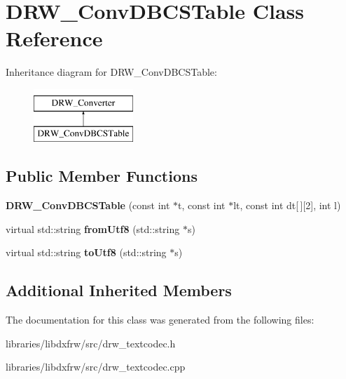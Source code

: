 \hypertarget{classDRW__ConvDBCSTable}{\section{D\-R\-W\-\_\-\-Conv\-D\-B\-C\-S\-Table Class Reference}
\label{classDRW__ConvDBCSTable}
}
Inheritance diagram for D\-R\-W\-\_\-\-Conv\-D\-B\-C\-S\-Table\-:\begin{figure}[H]
\begin{center}
\leavevmode
\includegraphics[height=2.000000cm]{classDRW__ConvDBCSTable}
\end{center}
\end{figure}
\subsection*{Public Member Functions}
\begin{DoxyCompactItemize}
\item 
\hypertarget{classDRW__ConvDBCSTable_a9708d6046edd8e7d38a1c82d7ba73ea6}{{\bfseries D\-R\-W\-\_\-\-Conv\-D\-B\-C\-S\-Table} (const int $\ast$t, const int $\ast$lt, const int dt\mbox{[}$\,$\mbox{]}\mbox{[}2\mbox{]}, int l)}\label{classDRW__ConvDBCSTable_a9708d6046edd8e7d38a1c82d7ba73ea6}

\item 
\hypertarget{classDRW__ConvDBCSTable_a7b001a255e8eae33cd904a8d5bafc063}{virtual std\-::string {\bfseries from\-Utf8} (std\-::string $\ast$s)}\label{classDRW__ConvDBCSTable_a7b001a255e8eae33cd904a8d5bafc063}

\item 
\hypertarget{classDRW__ConvDBCSTable_ae850948e670a3ea23a73b9f287614a76}{virtual std\-::string {\bfseries to\-Utf8} (std\-::string $\ast$s)}\label{classDRW__ConvDBCSTable_ae850948e670a3ea23a73b9f287614a76}

\end{DoxyCompactItemize}
\subsection*{Additional Inherited Members}


The documentation for this class was generated from the following files\-:\begin{DoxyCompactItemize}
\item 
libraries/libdxfrw/src/drw\-\_\-textcodec.\-h\item 
libraries/libdxfrw/src/drw\-\_\-textcodec.\-cpp\end{DoxyCompactItemize}

